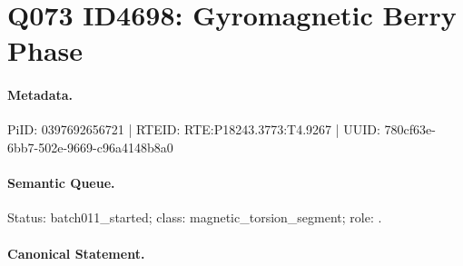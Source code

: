 \section*{Q073 ID4698: Gyromagnetic Berry Phase}
\paragraph{Metadata.}
PiID: 0397692656721 | RTEID: RTE:P18243.3773:T4.9267 | UUID: 780cf63e-6bb7-502e-9669-c96a4148b8a0

\paragraph{Semantic Queue.}
Status: batch011\_started; class: magnetic\_torsion\_segment; role: .

\paragraph{Canonical Statement.}
